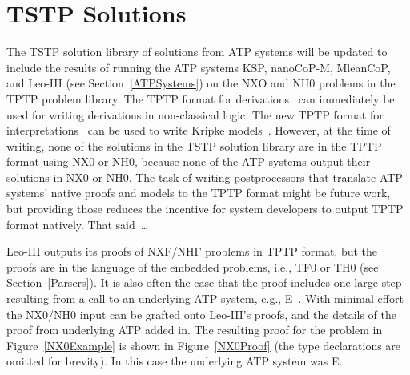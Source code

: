 \documentclass{ceurart}
\begin{document}
\section{TSTP Solutions}
\label{TSTP}

The TSTP solution library of solutions from ATP systems will be updated to include the results 
of running the ATP systems KSP, nanoCoP-M, MleanCoP, and Leo-III (see Section~\ref{ATPSystems}) 
on the NXO and NH0 problems in the TPTP problem library.
The TPTP format for derivations~\cite{SS+06} can immediately be used for writing derivations in
non-classical logic.
The new TPTP format for interpretations~\cite{SS+23-LPAR} can be used to write Kripke 
models~\cite{Kri63}.
However, at the time of writing, none of the solutions in the TSTP solution library are in the 
TPTP format using NX0 or NH0, because none of the ATP systems output their solutions in NX0 or NH0.
The task of writing postprocessors that translate ATP systems' native proofs and models to the
TPTP format might be future work, but providing those reduces the incentive for system developers
to output TPTP format natively.
That said~\ldots

Leo-III outputs its proofs of NXF/NHF problems in TPTP format, but the proofs are in the language 
of the embedded problems, i.e., TF0 or TH0 (see Section~\ref{Parsers}).
It is also often the case that the proof includes one large step resulting from a call to an 
underlying ATP system, e.g., E~\cite{SCV19}.
With minimal effort the NX0/NH0 input can be grafted onto Leo-III's proofs, and the details of
the proof from underlying ATP added in.
The resulting proof for the problem in Figure~\ref{NX0Example} is shown in Figure~\ref{NX0Proof} 
(the type declarations are omitted for brevity).
In this case the underlying ATP system was E.
\end{document}
